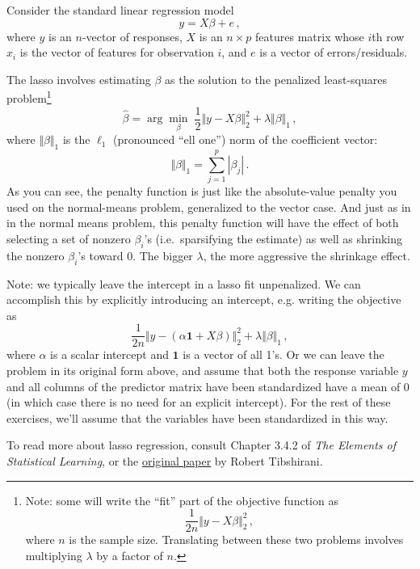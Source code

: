 \documentclass{mynotes}
\begin{document}
Consider the standard linear regression model
$$
y = X \beta + e \, ,
$$
where $y$ is an $n$-vector of responses, $X$ is an $n \times p$ features matrix whose $i$th row $x_i$ is the vector of features for observation $i$, and $e$ is a vector of errors/residuals.

The lasso involves estimating $\beta$ as the solution to the penalized least-squares problem\footnote{Note: some will write the ``fit'' part of the objective function as
$$
\frac{1}{2n} \Vert y - X \beta \Vert_2^2 \, ,
$$
where $n$ is the sample size.  Translating between these two problems involves multiplying $\lambda$ by a factor of $n$.
}
$$
\hat{\beta} = \arg \min_{\beta} \; \frac{1}{2} \Vert y - X \beta \Vert_2^2 + \lambda \Vert \beta \Vert_1 \, ,
$$
where $\Vert \beta \Vert_1$ is the $\ell_1$ (pronounced ``ell one'') norm of the coefficient vector:
$$
\Vert \beta \Vert_1 = \sum_{j=1}^p |\beta_j| \, .
$$
As you can see, the penalty function is just like the absolute-value penalty you used on the normal-means problem, generalized to the vector case.  And just as in in the normal means problem, this penalty function will have the effect of both selecting a set of nonzero $\beta_i$'s (i.e.~sparsifying the estimate) as well as shrinking the nonzero $\beta_i$'s toward 0.  The bigger $\lambda$, the more aggressive the shrinkage effect.

Note: we typically leave the intercept in a lasso fit unpenalized.  We can accomplish this by explicitly introducing an intercept, e.g. writing the objective as
$$
\frac{1}{2n} \Vert y - (\alpha \mathbf{1} + X \beta) \Vert_2^2 + \lambda \Vert \beta \Vert_1 \, ,
$$
where $\alpha$ is a scalar intercept and $\mathbf{1}$ is a vector of all 1's.  Or we can leave the problem in its original form above, and assume that both the response variable $y$ and all columns of the predictor matrix have been standardized have a mean of 0 (in which case there is no need for an explicit intercept).  For the rest of these exercises, we'll assume that the variables have been standardized in this way.

To read more about lasso regression, consult Chapter 3.4.2 of \textit{The Elements of Statistical Learning}, or the \href{http://statweb.stanford.edu/~tibs/lasso/lasso.pdf}{original paper} by Robert Tibshirani.
\end{document}
